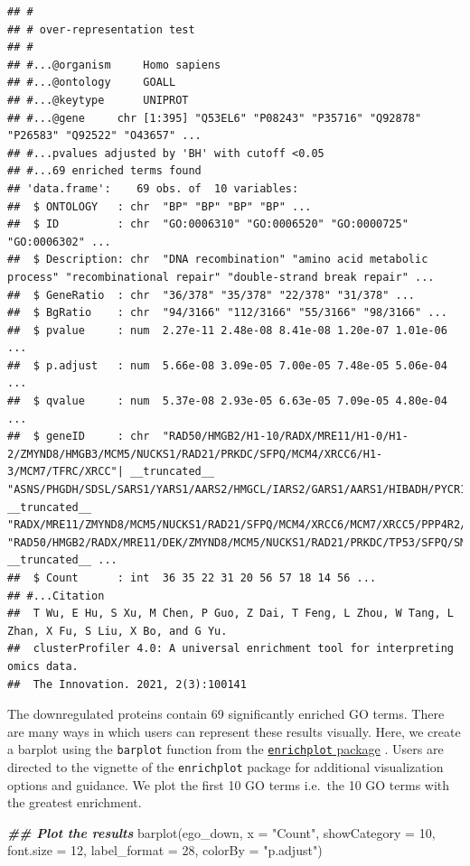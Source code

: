 \documentclass[9pt,a4paper,]{extarticle}
\newenvironment{Shaded}{\begin{snugshade}}{\end{snugshade}}
\newcommand{\AttributeTok}[1]{\textcolor[rgb]{0.77,0.63,0.00}{#1}}
\newcommand{\DecValTok}[1]{\textcolor[rgb]{0.00,0.00,0.81}{#1}}
\newcommand{\DocumentationTok}[1]{\textcolor[rgb]{0.56,0.35,0.01}{\textbf{\textit{#1}}}}
\newcommand{\FunctionTok}[1]{\textcolor[rgb]{0.00,0.00,0.00}{#1}}
\newcommand{\NormalTok}[1]{#1}
\newcommand{\StringTok}[1]{\textcolor[rgb]{0.31,0.60,0.02}{#1}}
\begin{document}
\begin{verbatim}
## #
## # over-representation test
## #
## #...@organism     Homo sapiens 
## #...@ontology     GOALL 
## #...@keytype      UNIPROT 
## #...@gene     chr [1:395] "Q53EL6" "P08243" "P35716" "Q92878" "P26583" "Q92522" "O43657" ...
## #...pvalues adjusted by 'BH' with cutoff <0.05 
## #...69 enriched terms found
## 'data.frame':    69 obs. of  10 variables:
##  $ ONTOLOGY   : chr  "BP" "BP" "BP" "BP" ...
##  $ ID         : chr  "GO:0006310" "GO:0006520" "GO:0000725" "GO:0006302" ...
##  $ Description: chr  "DNA recombination" "amino acid metabolic process" "recombinational repair" "double-strand break repair" ...
##  $ GeneRatio  : chr  "36/378" "35/378" "22/378" "31/378" ...
##  $ BgRatio    : chr  "94/3166" "112/3166" "55/3166" "98/3166" ...
##  $ pvalue     : num  2.27e-11 2.48e-08 8.41e-08 1.20e-07 1.01e-06 ...
##  $ p.adjust   : num  5.66e-08 3.09e-05 7.00e-05 7.48e-05 5.06e-04 ...
##  $ qvalue     : num  5.37e-08 2.93e-05 6.63e-05 7.09e-05 4.80e-04 ...
##  $ geneID     : chr  "RAD50/HMGB2/H1-10/RADX/MRE11/H1-0/H1-2/ZMYND8/HMGB3/MCM5/NUCKS1/RAD21/PRKDC/SFPQ/MCM4/XRCC6/H1-3/MCM7/TFRC/XRCC"| __truncated__ "ASNS/PHGDH/SDSL/SARS1/YARS1/AARS2/HMGCL/IARS2/GARS1/AARS1/HIBADH/PYCR1/MCCC2/ACADSB/DHFR/MARS1/SLC25A12/ETFA/PS"| __truncated__ "RADX/MRE11/ZMYND8/MCM5/NUCKS1/RAD21/SFPQ/MCM4/XRCC6/MCM7/XRCC5/PPP4R2/POGZ/YY1/MCM3/MCM2/VPS72/PARP1/BRD8/MCM6/FUS/RECQL" "RAD50/HMGB2/RADX/MRE11/DEK/ZMYND8/MCM5/NUCKS1/RAD21/PRKDC/TP53/SFPQ/SMARCC2/MCM4/XRCC6/HPF1/MCM7/XRCC5/HMGB1/PP"| __truncated__ ...
##  $ Count      : int  36 35 22 31 20 56 57 18 14 56 ...
## #...Citation
##  T Wu, E Hu, S Xu, M Chen, P Guo, Z Dai, T Feng, L Zhou, W Tang, L Zhan, X Fu, S Liu, X Bo, and G Yu.
##  clusterProfiler 4.0: A universal enrichment tool for interpreting omics data.
##  The Innovation. 2021, 2(3):100141
\end{verbatim}

The downregulated proteins contain 69 significantly enriched GO
terms. There are many ways in which users can represent these results visually.
Here, we create a barplot using the \texttt{barplot} function from the \href{https://bioconductor.org/packages/release/bioc/html/enrichplot.html}{\texttt{enrichplot} package}
\citep{enrichplot}. Users are directed to the vignette of the \texttt{enrichplot} package
for additional visualization options and guidance. We plot the first 10 GO terms
i.e.~the 10 GO terms with the greatest enrichment.

\begin{Shaded}
\begin{Highlighting}[]
\DocumentationTok{\#\# Plot the results}
\FunctionTok{barplot}\NormalTok{(ego\_down,}
        \AttributeTok{x =} \StringTok{"Count"}\NormalTok{,}
        \AttributeTok{showCategory =} \DecValTok{10}\NormalTok{,}
        \AttributeTok{font.size =} \DecValTok{12}\NormalTok{,}
        \AttributeTok{label\_format =} \DecValTok{28}\NormalTok{,}
        \AttributeTok{colorBy =} \StringTok{"p.adjust"}\NormalTok{)}
\end{Highlighting}
\end{Shaded}
\end{document}
